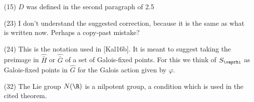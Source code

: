 (15) $D$ was defined in the second paragraph of 2.5

(23) I don't understand the suggested correction, because it is the same as what is written now. Perhaps a copy-past mistake?

(24) This is the notation used in [Kal16b]. It is meant to suggest taking the preimage in $\hat{\bar H}$ or $\hat{\bar G}$ of a set of Galois-fixed points. For this we think of $S_\vaprhi$ as Galois-fixed points in $\hat G$ for the Galois action given by $\varphi$.

(32) The Lie group $N(\R)$ is a nilpotent group, a condition which is used in the cited theorem.